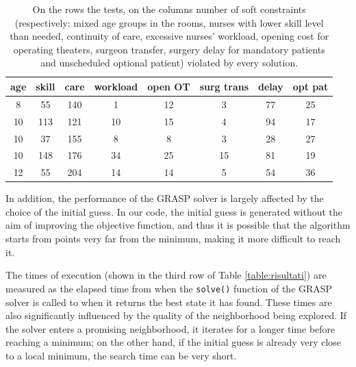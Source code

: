 \documentclass{article}
\begin{document}
\begin{table}[h!]
    \centering
    \begin{tabular}{|c|c|c|c|c|c|c|c|}
    \hline
    \textbf{age} & \textbf{skill} & \textbf{care} & \textbf{workload} & \textbf{open OT} & \textbf{surg trans} & \textbf{delay} & \textbf{opt pat}  \\ \hline
    8 & 55 & 140 & 1 & 12 & 3 & 77 & 25  \\ \hline
    10 & 113 & 121 & 10 & 15 & 4 & 94 & 17 \\ \hline
    10 & 37 & 155 & 8 & 8 & 3 & 28 & 27  \\ \hline
    10 & 148 & 176 & 34 & 25 & 15 & 81 & 19  \\ \hline
    12 & 55 & 204 & 14 & 14 & 5 & 54 & 36  \\ \hline
    \end{tabular}
    \caption{On the rows the tests, on the columns number of soft constraints (respectively: mixed age groups in the rooms, nurses with lower skill level than needed, continuity of care, excessive nurses' workload,
    opening cost for operating theaters, surgeon transfer, surgery delay for mandatory patients and unscheduled optional patient) violated by every solution.}
    \label{instances}
    \end{table}

In addition, the performance of the GRASP solver is largely affected by the choice of the initial guess. In our code, the initial guess is generated without the aim of improving the objective function, and thus it is possible that the algorithm starts from points very far from the minimum, making it more difficult to reach it.

The times of execution (shown in the third row of Table \ref{table:risultati}) are measured as the elapsed time from when the \verb+solve()+ function of the GRASP solver is called to when it returns the best state it has found. 
These times are also significantly influenced by the quality of the neighborhood being explored. If the solver enters a promising neighborhood, it iterates for a longer time before reaching a minimum; on the other hand, if the initial guess is already very close to a local minimum, the search time can be very short.
\end{document}
